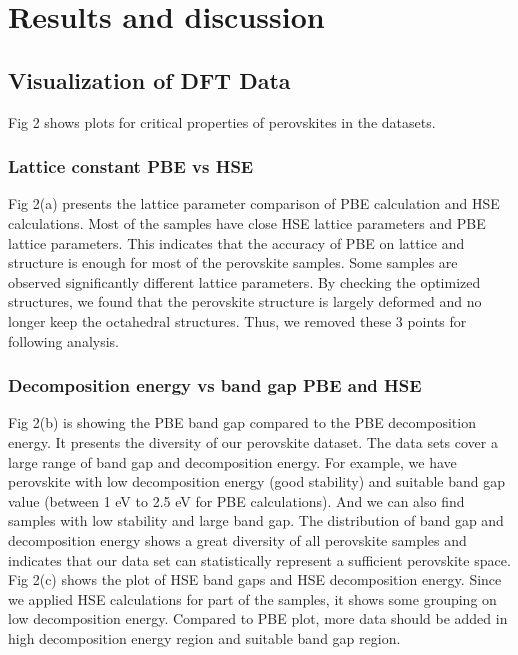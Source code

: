 \documentclass[twoside,twocolumn,9pt]{article}
\begin{document}
    \newpage




    \section*{Results and discussion}

    \subsection*{Visualization of DFT Data}

    Fig 2 shows plots for critical properties of perovskites in the datasets.

    \subsubsection*{Lattice constant PBE vs HSE}
    Fig 2(a) presents the lattice parameter comparison of PBE calculation
    and HSE calculations. Most of the samples have close HSE lattice
    parameters and PBE lattice parameters. This indicates that the
    accuracy of PBE on lattice and structure is enough for most of the
    perovskite samples. Some samples are observed significantly different
    lattice parameters. By checking the optimized structures, we found
    that the perovskite structure is largely deformed and no longer keep
    the octahedral structures. Thus, we removed these 3 points for
    following analysis.
    \subsubsection*{Decomposition energy vs band gap PBE and HSE}
    Fig 2(b) is showing the PBE band gap compared to the PBE decomposition
    energy. It presents the diversity of our perovskite dataset. The data
    sets cover a large range of band gap and decomposition energy. For
    example, we have perovskite with low decomposition energy (good
    stability) and suitable band gap value (between 1 eV to 2.5 eV for PBE
    calculations). And we can also find samples with low stability and
    large band gap. The distribution of band gap and decomposition energy
    shows a great diversity of all perovskite samples and indicates that
    our data set can statistically represent a sufficient perovskite
    space.  Fig 2(c) shows the plot of HSE band gaps and HSE decomposition
    energy. Since we applied HSE calculations for part of the samples, it
    shows some grouping on low decomposition energy. Compared to PBE plot,
    more data should be added in high decomposition energy region and
    suitable band gap region.
\end{document}
